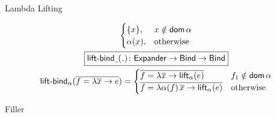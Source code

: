 \documentclass{haskellbeamer}
\newcommand{\mkRhs}[2]{\lambda #1 \to #2}
\newcommand{\mkBind}[2]{#1 \mathrel{=} #2}
\newcommand{\mkBindr}[2]{\overline{\mkBind{#1}{#2}}}
\newcommand{\sfop}[1]{\textsf{#1}\xspace}
\newcommand{\fun}[1]{\textsf{#1}\xspace}
\newcommand{\ty}[1]{\textsf{#1}\xspace}
\newcommand{\lift}{\fun{lift}}
\newcommand{\liftb}{\fun{lift-bind}}
\newcommand{\expander}{\ty{Expander}}
\newcommand{\bindgr}{\ty{Bind}}
\newcommand{\dom}[1]{\sfop{dom}\,#1}
\newcommand{\absids}{\alpha}
\begin{document}
\begin{frame}[fragile]{Lambda Lifting}
{\begin{minipage}{\textwidth}
\begin{mdframed}
\begin{gather*}
  \begin{cases}
    \{x\},      & x \notin \dom{\absids} \\
    \absids(x), & \text{otherwise}
  \end{cases} \\
\boxed{\liftb_{\mathunderscore}(\mathunderscore) \colon \expander \to \bindgr \to \bindgr} \\
\liftb_\absids(\mkBindr{f}{\mkRhs{\overline{x}}{e}}) =
  \begin{cases}
	\mkBindr{f}{\mkRhs{\overline{x}}{\lift_\absids(e)}} & f_1 \notin \dom \absids \\
	\mkBindr{f}{\mkRhs{\absids(f)\,\overline{x}}{\lift_\absids(e)}} & \text{otherwise} \\
  \end{cases} \\
\end{gather*}
\end{mdframed}
\end{minipage}
}
\end{frame}

\begin{frame}[fragile]{Filler}
\end{frame}
\end{document}
